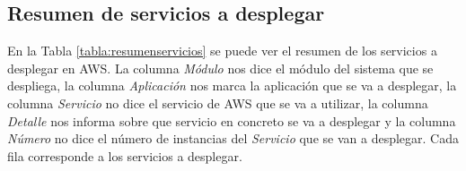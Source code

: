 \subsection{Resumen de servicios a desplegar}

\begin{table}[H]\label{tabla:resumenservicios}
	\centering
	\caption{Recursos de servicios a desplegar}
\end{table}

En la Tabla \ref{tabla:resumenservicios} se puede ver el resumen de los servicios a desplegar en AWS. La columna \textit{Módulo} nos dice el módulo del sistema que se despliega, la columna \textit{Aplicación} nos marca la aplicación que se va a desplegar, la columna \textit{Servicio} no dice el servicio de AWS que se va a utilizar, la columna \textit{Detalle} nos informa sobre que servicio en concreto se va a desplegar y la columna \textit{Número} no dice el número de instancias del \textit{Servicio} que se van a desplegar. Cada fila corresponde a los servicios a desplegar.

